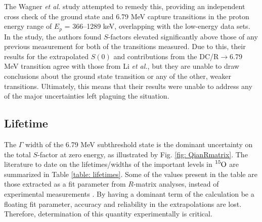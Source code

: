 The Wagner \textit{et al.} study attempted to remedy this, providing an independent cross check of the ground state and 6.79 MeV capture transitions in the proton energy range of $E_{p}$ = 366–1289 keV, overlapping with the low-energy data sets. In the study, the authors found $S$-factors elevated significantly above those of any previous measurement for both of the transitions measured. Due to this, their results for the extrapolated $S(0)$ and contributions from the DC/R$\rightarrow$6.79 MeV transition agree with those from Li \textit{et al.}, but they are unable to draw conclusions about the ground state transition or any of the other, weaker transitions. Ultimately, this means that their results were unable to address any of the major uncertainties left plaguing the situation. 



\subsection{Lifetime}
\label{sec: lifetimeLiterature}


The $\Gamma$ width of the 6.79 MeV subthreshold state is the dominant uncertainty on the total $S$-factor at zero energy, as illustrated by Fig. \ref{fig: QianRmatrix}. The literature to date on the lifetimes/widths of the important levels in $\ce{^{15}O}$ are summarized in Table \ref{table: lifetimes}. Some of the values present in the table are those extracted as a fit parameter from $R$-matrix analyses, instead of experimental measurements \cite{Schroder1987, Angulo2001, Formicola2004, Runkle2005, Marta2008, Azuma2010, Adelberger2011b}. By having a dominant term of the calculation be a floating fit parameter, accuracy and reliability in the extrapolations are lost. Therefore, determination of this quantity experimentally is critical. 


